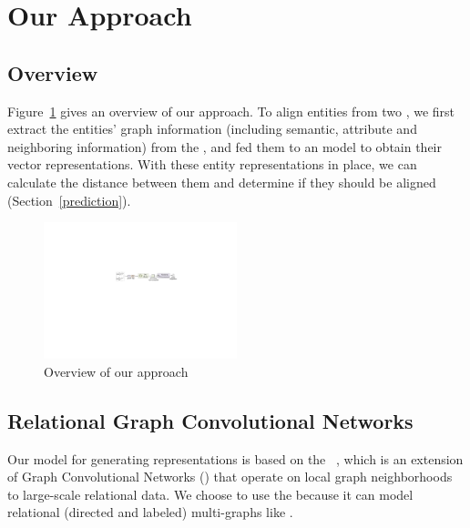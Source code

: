 \section{Our Approach}
	\label{section:app}

\subsection{Overview}
Figure~\ref{fig:overview} gives an overview of our approach. To align entities from two \KGs, 
we first extract the entities' graph information (including semantic, attribute and neighboring information) from the \KGs, 
and fed them to an \HRGCN model to obtain their vector representations. 
With these entity
representations in place, we can calculate the distance between %
them and determine if they should be
aligned (Section~\ref{prediction}).

\begin{figure}[t!]
  \centering
  \includegraphics[width=0.5\textwidth]{figures/overview.pdf}
  \caption{Overview of our approach}\label{fig:overview}
\end{figure}


	
    \subsection{Relational Graph Convolutional Networks\label{sec:model}}
    Our model for generating \KG representations  is based on the \RGCN~\cite{Schlichtkrull2017Modeling}, which is an extension of Graph Convolutional Networks (\GCNs) that operate on local graph
neighborhoods~\cite{Duvenaud2015Convolutional,Kipf2016Semi} to large-scale relational data.
    We choose to use the \RGCN because it can model relational (directed and labeled) multi-graphs like \KGs.

